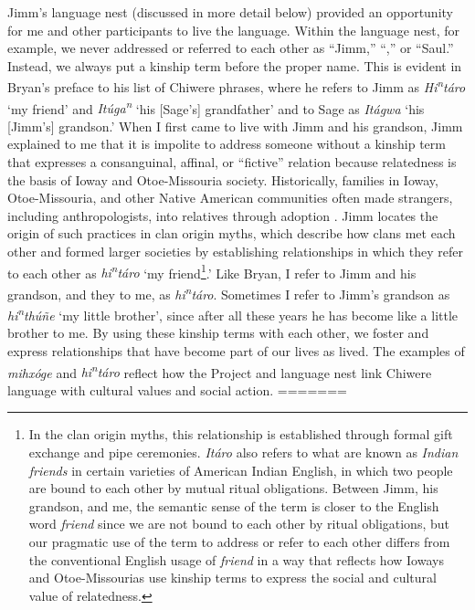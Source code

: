 \documentclass[output=paper]{LSP/langsci}
\begin{document}
Jimm's language nest (discussed in more detail below) provided an opportunity for me and other participants to live the language. Within the language nest, for example, we never addressed or referred to each other as ``Jimm,'' ``,'' or ``Saul.'' Instead, we always put a kinship term before the proper name. This is evident in Bryan's preface to his list of Chiwere phrases, where he refers to Jimm as \emph{Hi\textsuperscript{n}táro} `my friend' and \emph{It\'uga\textsuperscript{n}} `his [Sage's] grandfather' and to Sage as \emph{Itágwa} `his [Jimm's] grandson.' When I first came to live with Jimm and his grandson, Jimm explained to me that it is impolite to address someone without a kinship term that expresses a consanguinal, affinal, or ``fictive'' relation because relatedness is the basis of Ioway and Otoe-Missouria society. Historically, families in Ioway, Otoe-Missouria, and other Native American communities often made strangers, including anthropologists, into relatives through adoption \citep[see e.g.][]{Kan2001}. Jimm locates the origin of such practices in clan origin myths, which describe how clans met each other and formed larger societies by establishing relationships in which they refer to each other as \emph{hi\textsuperscript{n}táro} `my friend\footnote{In the clan origin myths, this relationship is established through formal gift exchange and pipe ceremonies. \emph{Itáro} also refers to what are known as \emph{Indian friends} in certain varieties of American Indian English, in which two people are bound to each other by mutual ritual obligations. Between Jimm, his grandson, and me, the semantic sense of the term is closer to the English word \emph{friend} since we are not bound to each other by ritual obligations, but our pragmatic use of the term to address or refer to each other differs from the conventional English usage of \emph{friend} in a way that reflects how Ioways and Otoe-Missourias use kinship terms to express the social and cultural value of relatedness.}.' Like Bryan, I refer to Jimm and his grandson, and they to me, as \emph{hi\textsuperscript{n}táro}. Sometimes I refer to Jimm's grandson as \emph{hi\textsuperscript{n}th\'uñe} `my little brother', since after all these years he has become like a little brother to me. By using these kinship terms with each other, we foster and express relationships that have become part of our lives as lived. The examples of \emph{mihxóge} and \emph{hi\textsuperscript{n}táro} reflect how the Project and language nest link Chiwere language with cultural values and social action.
=======
\end{document}
